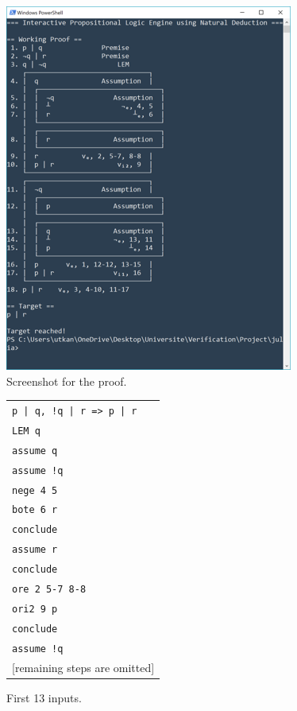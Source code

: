 \documentclass[12pt]{article}
\begin{document}
\begin{minipage}{0.65\textwidth}
\begin{figure}[H]
	\centering
	\includegraphics[scale=0.92]{example.png}
	\caption{Screenshot for the proof.}
\end{figure}
\end{minipage}
\begin{minipage}{0.35\textwidth}
\begin{figure}[H]
	\centering
	\begin{tabular}{l}
		\verb^p | q, !q | r => p | r^\\
		\verb^LEM q^\\
		\verb^assume q^\\
		\verb^assume !q^\\
		\verb^nege 4 5^\\
		\verb^bote 6 r^\\
		\verb^conclude^\\
		\verb^assume r^\\
		\verb^conclude^\\
		\verb^ore 2 5-7 8-8^\\
		\verb^ori2 9 p^\\
		\verb^conclude^\\
		\verb^assume !q^\\
		{[remaining steps are omitted]}
	\end{tabular}
	\caption{First 13 inputs.}
\end{figure}
\end{minipage}
\end{document}
